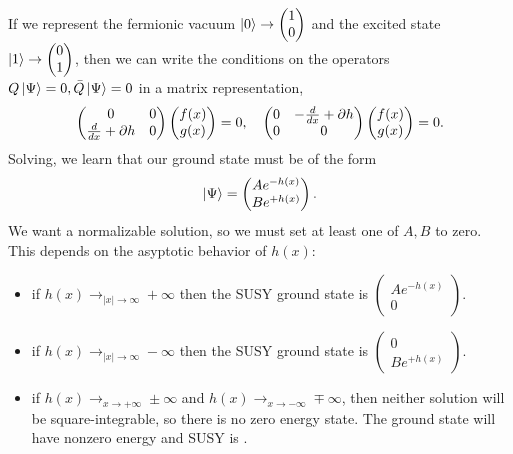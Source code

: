 If we represent the fermionic vacuum $\left| 0 \right>\to \begin{pmatrix}1\\0\end{pmatrix}$ and the excited state $\left| 1 \right>\to \begin{pmatrix}0\\1\end{pmatrix}$, then we can write the conditions on the operators $Q\left| \Psi \right>=0,\bar Q\left| \Psi \right>=0$ in a matrix representation,
\begin{equation}
    \begin{pmatrix}
        0 & 0\\
        \frac{d}{dx} + \partial h & 0
    \end{pmatrix}
    \begin{pmatrix}
        f(x)\\ g(x)
    \end{pmatrix}
    =0,
    \quad
    \begin{pmatrix}
        0 & -\frac{d}{dx} + \partial h\\
        0 & 0
    \end{pmatrix}
    \begin{pmatrix}
        f(x)\\ g(x)
    \end{pmatrix}
    =0.
\end{equation}
Solving, we learn that our ground state must be of the form
\begin{equation}
    \left| \Psi \right>=\begin{pmatrix}
        A e^{-h(x)}\\
        B e^{+h(x)}
    \end{pmatrix}.
\end{equation}
We want a normalizable solution, so we must set at least one of $A,B$ to zero. This depends on the asyptotic behavior of $h(x)$:
\begin{itemize}
    \item if $h(x)\to_{|x|\to \infty}+\infty$ then the SUSY ground state is $\begin{pmatrix}
        A e^{-h(x)}\\
        0
    \end{pmatrix}.$
    \item if $h(x)\to_{|x|\to \infty}-\infty$ then the SUSY ground state is $\begin{pmatrix}
        0\\
        B e^{+h(x)}
    \end{pmatrix}.$
    \item if $h(x) \to_{x\to +\infty} \pm \infty$ and $h(x)\to_{x\to -\infty} \mp \infty$, then neither solution will be square-integrable, so there is no zero energy state. The ground state will have nonzero energy and SUSY is . 
\end{itemize}